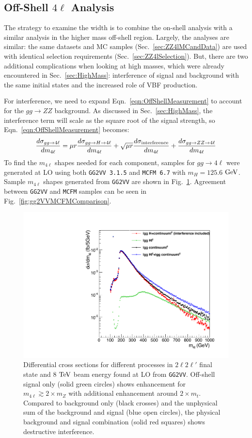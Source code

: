 \subsection{Off-Shell $4\ell$ Analysis}
\label{sec:OffShellAnalysis}

The strategy to examine the width is to combine the on-shell analysis with a similar analysis in the higher mass off-shell region. Largely, the analyses are similar: the same datasets and MC samples (Sec.~\ref{sec:ZZ4lMCandData}) are used with identical selection requirements (Sec.~\ref{sec:ZZ4lSelection}). But, there are two additional complications when looking at high masses, which were already encountered in Sec.~\ref{sec:HighMass}: interference of signal and background with the same initial states and the increased role of VBF production.

For interference, we need to expand Eqn.~\ref{eqn:OffShellMeasurement} to account for the $gg\rightarrow ZZ$ background. As discussed in Sec.~\ref{sec:HighMass}, the interference term will scale as the square root of the signal strength, so Eqn.~\ref{eqn:OffShellMeasurement} becomes:
\begin{equation}
\frac{d\sigma_{gg\rightarrow 4\ell}}{dm_{4\ell}} = \mu r \frac{d\sigma_{gg\rightarrow H \rightarrow 4\ell}}{dm_{4\ell}} + \sqrt{\mu r} \frac{d\sigma_{\rm interference}}{dm_{4\ell}} + \frac{d\sigma_{gg\rightarrow ZZ \rightarrow 4\ell}}{dm_{4\ell}}
\label{eqn:OffShellDiff_ZZ}
\end{equation}
To find the $m_{4\ell}$ shapes needed for each component, samples for $gg\rightarrow 4\ell$ were generated at LO using both {\tt GG2VV 3.1.5} and {\tt MCFM 6.7} with $m_H=125.6$ $\rm{GeV}$. Sample $m_{4\ell}$ shapes generated from {\tt GG2VV} are shown in Fig.~\ref{fig:gg2VVDiffXSec}. Agreement between {\tt GG2VV} and {\tt MCFM} samples can be seen in Fig.~\ref{fig:gg2VVMCFMComparison}.

\begin{figure}[htbp]
\begin{center}
\includegraphics[width=.5\linewidth]{HiggsProperties/figures/gg2VV.pdf}
\caption[Differential Cross Section at LO from gg2VV for Off-shell Region]{Differential cross sections for different processes in $2\ell2\ell'$ final state and 8 $\rm{TeV}$ beam energy found at LO from {\tt GG2VV}. Off-shell signal only (solid green circles) shows enhancement for $m_{4\ell} \gtrsim 2\times m_Z$ with additional enhancement around $2\times m_{t}$. Compared to background only (black crosses) and the unphysical sum of the background and signal (blue open circles), the physical background and signal combination (solid red squares) shows destructive interference.}
\label{fig:gg2VVDiffXSec}
\end{center}
\end{figure}

